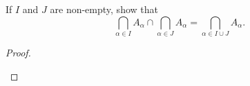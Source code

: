 \documentclass[../../main.tex]{subfiles}
\begin{document}
\begin{q}
    If $I$ and $J$ are non-empty, show that
    \[\bigcap_{\alpha \in I} A_\alpha \cap \bigcap_{\alpha \in J} A_\alpha = \bigcap_{\alpha \in I \cup J} A_\alpha.\]
\end{q}


\begin{proof}
    
    \begin{xx}
    \begin{linebyline}
        
    \end{linebyline}
    \end{xx}
\end{proof}
\end{document}
